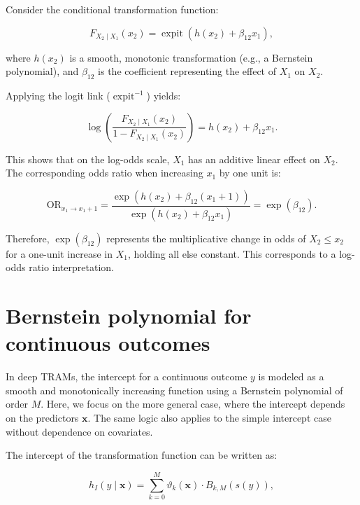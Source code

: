 Consider the conditional transformation function:

\begin{equation}
F_{X_2 \mid X_1}(x_2) = \operatorname{expit}( h(x_2) + \beta_{12} x_1 ),
\end{equation}


where $h(x_2)$ is a smooth, monotonic transformation (e.g., a Bernstein polynomial), and $\beta_{12}$ is the coefficient representing the effect of $X_1$ on $X_2$.

Applying the logit link ($\operatorname{expit}^{-1}$) yields:

\begin{equation}
\log\left( \frac{F_{X_2 \mid X_1}(x_2)}{1 - F_{X_2 \mid X_1}(x_2)} \right)
= h(x_2) + \beta_{12} x_1.
\end{equation}


This shows that on the log-odds scale, $X_1$ has an additive linear effect on $X_2$. The corresponding odds ratio when increasing $x_1$ by one unit is:

\begin{equation}
\text{OR}_{x_1 \to x_1 + 1} = 
\frac{\exp(h(x_2) + \beta_{12}(x_1 + 1))}{\exp(h(x_2) + \beta_{12} x_1)} 
= \exp(\beta_{12}).
\end{equation}

Therefore, $\exp(\beta_{12})$ represents the multiplicative change in odds of $X_2 \le x_2$ for a one-unit increase in $X_1$, holding all else constant. This corresponds to a log-odds ratio interpretation.






\section{Bernstein polynomial for continuous outcomes} \label{sec:bernstein_polynomial}

In deep TRAMs, the intercept for a continuous outcome $y$ is modeled as a smooth and monotonically increasing function using a Bernstein polynomial of order $M$. Here, we focus on the more general case, where the intercept depends on the predictors $\mathbf{x}$. The same logic also applies to the simple intercept case without dependence on covariates.

The intercept of the transformation function can be written as:

\begin{equation}
h_I(y \mid \mathbf{x}) = \sum_{k=0}^{M} \vartheta_k(\mathbf{x}) \cdot B_{k, M}(s(y)),
\label{eq:bernstein_intercept}
\end{equation}

